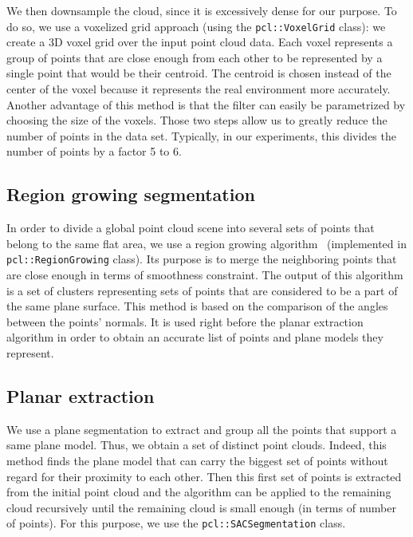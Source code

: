 We then downsample the cloud, since it is excessively dense for our purpose. To do so, we use a voxelized grid approach (using the {\tt pcl::VoxelGrid} class): we create a 3D voxel grid over the input point cloud data. Each voxel represents a group of points that are close enough from each other to be represented by a single point that would be their centroid. The centroid is chosen instead of the center of the voxel because it represents the real environment more accurately. Another advantage of this method is that the filter can easily be parametrized by choosing the size of the voxels. Those two steps allow us to greatly reduce the number of points in the data set. Typically, in our experiments, this divides the number of points by a factor 5 to 6.

\subsection{Region growing segmentation}
\label{subsect:region}

In order to divide a global point cloud scene into several sets of points that belong to the same flat area, we use a region growing algorithm~\cite{poppinga:iros:2008} (implemented in {\tt pcl::RegionGrowing} class). Its purpose is to merge the neighboring points that are close enough in terms of smoothness constraint. The output of this algorithm is a set of clusters representing sets of points that are considered to be a part of the same plane surface. This method is based on the comparison of the angles between the points' normals. 
It is used right before the planar extraction algorithm in order to obtain an accurate list of points and plane models they represent. 

\subsection{Planar extraction}
\label{subsect:PlanExtract}

We use a plane segmentation to extract and group all the points that support a same plane model. Thus, we obtain a set of distinct point clouds. Indeed, this method finds the plane model that can carry the biggest set of points without regard for their proximity to each other. Then this first set of points is extracted from the initial point cloud and the algorithm can be applied to the remaining cloud recursively until the remaining cloud is small enough (in terms of number of points). For this purpose, we use the {\tt pcl::SACSegmentation} class.

